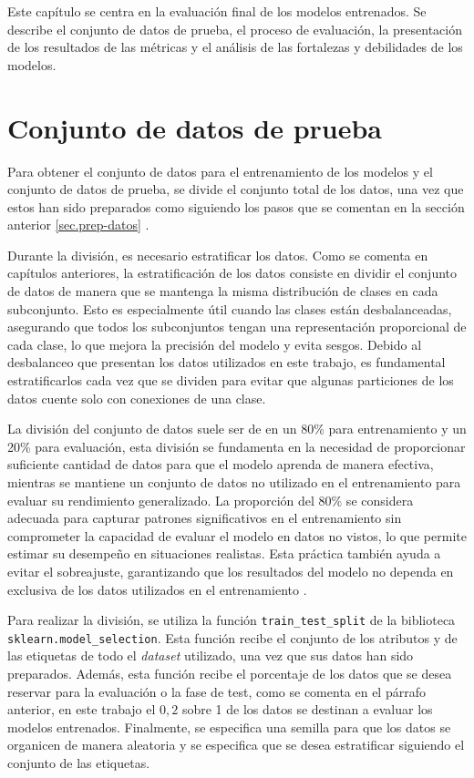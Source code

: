 Este capítulo se centra en la evaluación final de los modelos entrenados. Se describe el conjunto de datos de prueba, el proceso de evaluación, la presentación de los resultados de las métricas y el análisis de las fortalezas y debilidades de los modelos.

\section{Conjunto de datos de prueba}
Para obtener el conjunto de datos para el entrenamiento de los modelos y el conjunto de datos de prueba, se divide el conjunto total de los datos, una vez que estos han sido preparados como siguiendo los pasos que se comentan en la sección anterior \ref{sec.prep-datos} . 

Durante la división, es necesario estratificar los datos. Como se comenta en capítulos anteriores, la estratificación de los datos consiste en dividir el conjunto de datos de manera que se mantenga la misma distribución de clases en cada subconjunto. Esto es especialmente útil cuando las clases están desbalanceadas, asegurando que todos los subconjuntos tengan una representación proporcional de cada clase, lo que mejora la precisión del modelo y evita sesgos. Debido al desbalanceo que presentan los datos utilizados en este trabajo, es fundamental estratificarlos cada vez que se dividen para evitar que algunas particiones de los datos cuente solo con conexiones de una clase.

La división del conjunto de datos suele ser de en un 80\% para entrenamiento y un 20\% para evaluación, esta división se fundamenta en la necesidad de proporcionar suficiente cantidad de datos para que el modelo aprenda de manera efectiva, mientras se mantiene un conjunto de datos no utilizado en el entrenamiento para evaluar su rendimiento generalizado. La proporción del 80\% se considera adecuada para capturar patrones significativos en el entrenamiento sin comprometer la capacidad de evaluar el modelo en datos no vistos, lo que permite estimar su desempeño en situaciones realistas. Esta práctica también ayuda a evitar el sobreajuste, garantizando que los resultados del modelo no dependa en exclusiva de los datos utilizados en el entrenamiento \cite{bishop2006pattern}.

Para realizar la división, se utiliza la función \texttt{train\_test\_split} de la biblioteca \texttt{sklearn.model\_selection}. Esta función recibe el conjunto de los atributos y de las etiquetas de todo el \textit{dataset} utilizado, una vez que sus datos han sido preparados. Además, esta función recibe el porcentaje de los datos que se desea reservar para la evaluación o la fase de test, como se comenta en el párrafo anterior, en este trabajo el $0,2$ sobre 1 de los datos se destinan a evaluar los modelos entrenados. Finalmente, se especifica una semilla para que los datos se organicen de manera aleatoria y se especifica que se desea estratificar siguiendo el conjunto de las etiquetas.

